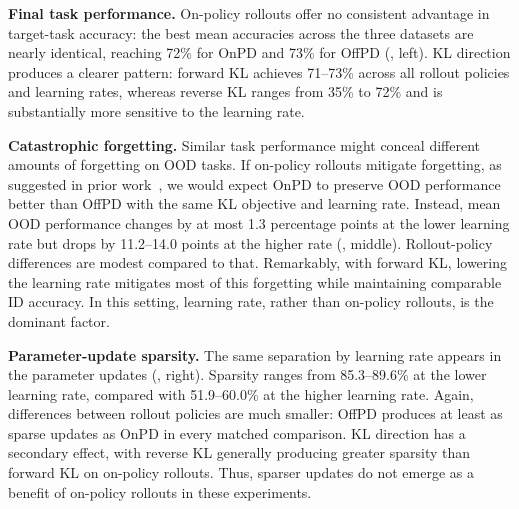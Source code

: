 \documentclass{article} %
\theoremstyle{plain}
\theoremstyle{definition}
\theoremstyle{remark}
\begin{document}
\textbf{Final task performance.} 
On-policy rollouts offer no consistent advantage in target-task accuracy: the best mean accuracies across the three datasets are nearly identical, reaching 72\% for OnPD and 73\% for OffPD (, left).
KL direction produces a clearer pattern: forward KL achieves 71--73\% across all rollout policies and learning rates, whereas reverse KL ranges from 35\% to 72\% and is substantially more sensitive to the learning rate.

\textbf{Catastrophic forgetting.} Similar task performance might conceal different amounts of forgetting on OOD tasks. If on-policy rollouts mitigate forgetting, as suggested in prior work~\citep{shenfeld_rls_2025, chen_retaining_2025}, we would expect OnPD to preserve OOD performance better than OffPD with the same KL objective and learning rate.
Instead, mean OOD performance changes by at most 1.3 percentage points at the lower learning rate but drops by 11.2--14.0 points at the higher rate (, middle). Rollout-policy differences are modest compared to that. Remarkably, with forward KL, lowering the learning rate mitigates most of this forgetting while maintaining comparable ID accuracy. In this setting, learning rate, rather than on-policy rollouts, is the dominant factor.

\textbf{Parameter-update sparsity.} The same separation by learning rate appears in the parameter updates (, right). Sparsity ranges from 85.3--89.6\% at the lower learning rate, compared with 51.9--60.0\% at the higher learning rate. Again, differences between rollout policies are much smaller: OffPD produces at least as sparse updates as OnPD in every matched comparison. KL direction has a secondary effect, with reverse KL generally producing greater sparsity than forward KL on on-policy rollouts. Thus, sparser updates do not emerge as a benefit of on-policy rollouts in these experiments.
\end{document}
